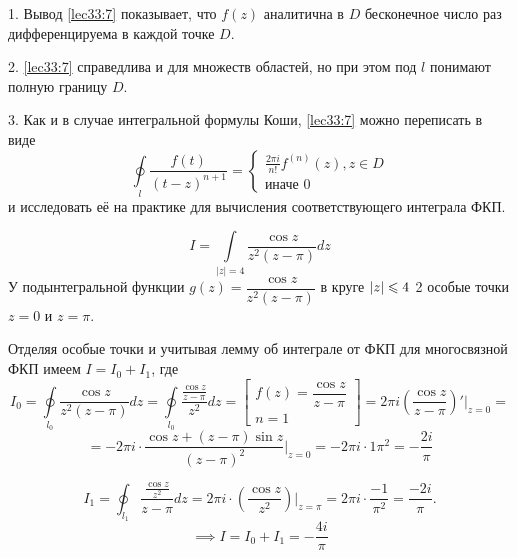 \documentclass[../../main.tex]{subfiles}
\begin{document}
\begin{rems}
	\item[1.] Вывод \eqref{lec33:7} показывает, что $f(z)$ аналитична в 
	$D$ бесконечное число раз дифференцируема в каждой точке
	$D$.
	\item[2.] \eqref{lec33:7} справедлива и для множеств
	областей, но при этом под $l$ понимают полную границу $D$.
	
	\item[3.] Как и в случае интегральной формулы Коши, 
	\eqref{lec33:7} можно переписать в виде 
	\[
	\oint\limits_l \frac{f(t)}{(t-z)^{n+1}} = 
	\begin{cases}
	\frac{2\pi i}{n!} f^{(n)}(z), z \in D \\
	\text{иначе 0}
	\end{cases}
	\]
	и исследовать её на практике для вычисления
	соответствующего интеграла ФКП.
\end{rems}
\begin{exmp}
	\[
	I = \int\limits_{|z|=4}\frac{\cos z}{z^2 (z-\pi)}
	dz
	\]
	У подынтегральной функции $g(z)=\dfrac{\cos z}
	{z^2(z-\pi)}$ в круге $\left|{z}\right| \leqslant 4$
	2 особые точки $z=0$ и $z=\pi$.
	
	
	Отделяя особые точки и учитывая лемму об 
	интеграле от ФКП для многосвязной ФКП имеем 
	$I = I_0 + I_1$, где 
	\[
	I_0 = 
	\oint\limits_{l_0}\dfrac{\cos z}{z^2(z - \pi)} 
	dz=
	\oint\limits_{l_0}\dfrac{\frac{\cos z}
		{z-\pi}}{z^2} dz
	= \left[
	\begin{array}{l}
	f(z) = \dfrac{\cos z}{z-\pi} \\
	n = 1
	\end{array}
	\right] = 
	2\pi i \left( \dfrac{\cos z}{z-\pi}\right)'
	|_{z=0}=
	\]
	\[= -2\pi i \cdot \dfrac{\cos z + 
		(z - \pi) \sin z}{(z-\pi)^2}|_{z=0}=
	-2\pi i \cdot {1}{\pi ^2} = -\dfrac{2i}{\pi}
	\]
	
	\[
	I_1 = \oint_{l_1} \dfrac{\frac{\cos z}{z^2}}
	{z-\pi} dz = 2 \pi i \cdot \left(
	\dfrac{\cos z}{z^2}
	\right) |_{z=\pi} = 2\pi i \cdot \dfrac{-1}{\pi^2}
	=\dfrac{-2i}{\pi}.
	\]
	\[
	\implies I = I_0 + I_1 = -\dfrac{4i}{\pi}
	\]
\end{exmp}
\end{document}
